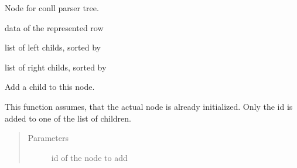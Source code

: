 \documentclass[letterpaper,10pt,english]{sphinxmanual}
\begin{document}

\begin{fulllineitems}
\label{\detokenize{api:conll_parser.Node}}
Node for conll parser tree.

\begin{fulllineitems}
\label{\detokenize{api:conll_parser.Node.data}}
data of the represented row

\end{fulllineitems}


\begin{fulllineitems}
\label{\detokenize{api:conll_parser.Node.lchilds}}
list of left childs, sorted by 

\end{fulllineitems}


\begin{fulllineitems}
\label{\detokenize{api:conll_parser.Node.rchilds}}
list of right childs, sorted by 

\end{fulllineitems}


\begin{fulllineitems}
\label{\detokenize{api:conll_parser.Node.__init__}}
\end{fulllineitems}


\begin{fulllineitems}
\label{\detokenize{api:conll_parser.Node.add_child}}
Add a child to this node.

This function assumes, that the actual node is already
initialized. Only the id is added to one of the list of
children.
\begin{quote}\begin{description}
\item[{Parameters}] \leavevmode
{} \textendash{} id of the node to add


\end{description}
\end{quote}
\end{fulllineitems}
\end{fulllineitems}
\end{document}

